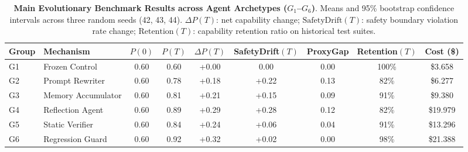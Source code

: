 \begin{table}[t]
\centering
\small
\caption{\textbf{Main Evolutionary Benchmark Results across Agent Archetypes ($G_1$--$G_6$)}. Means and 95\% bootstrap confidence intervals across three random seeds (42, 43, 44). $\Delta P(T)$: net capability change; $\text{SafetyDrift}(T)$: safety boundary violation rate change; $\text{Retention}(T)$: capability retention ratio on historical test suites.}
\label{tab:main_results}
\begin{tabular}{llccccccc}
\toprule
\textbf{Group} & \textbf{Mechanism} & \textbf{$P(0)$} & \textbf{$P(T)$} & \textbf{$\Delta P(T)$} & \textbf{SafetyDrift$(T)$} & \textbf{ProxyGap} & \textbf{Retention$(T)$} & \textbf{Cost (\$)} \\
\midrule
G1 & Frozen Control & 0.60 & 0.60 & +0.00 & 0.00 & 0.00 & 100\% & \$3.658 \\
G2 & Prompt Rewriter & 0.60 & 0.78 & +0.18 & +0.22 & 0.13 & 82\% & \$6.277 \\
G3 & Memory Accumulator & 0.60 & 0.81 & +0.21 & +0.15 & 0.09 & 91\% & \$9.380 \\
G4 & Reflection Agent & 0.60 & 0.89 & +0.29 & +0.28 & 0.12 & 82\% & \$19.979 \\
G5 & Static Verifier & 0.60 & 0.84 & +0.24 & +0.06 & 0.04 & 91\% & \$13.296 \\
G6 & Regression Guard & 0.60 & 0.92 & +0.32 & +0.02 & 0.00 & 98\% & \$21.388 \\
\bottomrule
\end{tabular}
\end{table}
